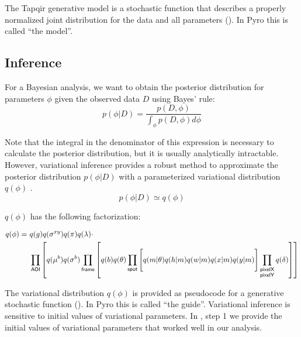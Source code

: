 The Tapqir generative model is a stochastic function that describes a properly normalized joint distribution for the data and all parameters (). In Pyro this is called ``the model''.
 


\subsection{Inference}

For a Bayesian analysis, we want to obtain the posterior distribution for parameters $\phi$ given the observed data $D$ using Bayes' rule:
%
\begin{equation}
    p(\phi | D) =
    \dfrac{p(D, \phi)}{\int_{\phi} p(D, \phi) d\phi}
\end{equation}

Note that the integral in the denominator of this expression is necessary to calculate the posterior distribution, but it is usually analytically intractable. However, variational inference provides a robust method to approximate the posterior distribution $p(\phi | D)$ with a parameterized variational distribution $q(\phi)$ \citep{Bishop2006-oa}.
%
\begin{equation}
    p(\phi | D) \simeq q(\phi)
\end{equation}


$q(\phi)$ has the following factorization:

\begin{equation}
\begin{aligned}
    q(\phi) =~&q(g) q(\sigma^{xy}) q(\pi) q(\lambda) \cdot \\
    &\prod_{\mathsf{AOI}} \left[ q(\mu^b) q(\sigma^b) \prod_{\mathsf{frame}} \left[ q(b) q(\theta) \prod_{\mathsf{spot}} \left[ \vphantom{\prod_{F}} q(m | \theta) q(h | m) q(w | m) q(x | m) q(y | m) \right] \prod_{\substack{\mathsf{pixelX} \\ \mathsf{pixelY}}} q(\delta) \right] \right]
\end{aligned}
\end{equation}

The variational distribution $q(\phi)$ is provided as pseudocode for a generative stochastic function (). In Pyro this is called ``the guide''. Variational inference is sensitive to initial values of variational parameters. In , step 1 we provide the initial values of variational parameters that worked well in our analysis.

